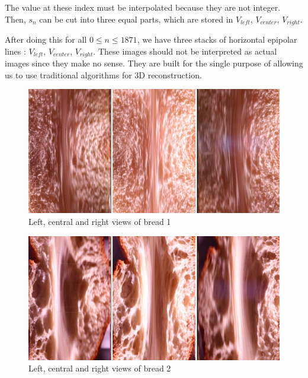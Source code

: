 \documentclass[a4paper,twocolumn,fleqn]{article}
\begin{document}
The value at these index must be interpolated because they are not integer. Then, $s_n$ can be cut into three equal parts, which are stored in $V_{left}$, $V_{center}$, $V_{right}$.

After doing this for all $0 \leq n \leq 1871$, we have three stacks of horizontal epipolar lines :  $V_{left}$, $V_{center}$, $V_{right}$. These images should not be interpreted as actual images since they make no sense. They are built for the single purpose of allowing us to use traditional algorithms for 3D reconstruction.

\begin{figure}[!hb]
  \centering
  \includegraphics[width=1\columnwidth]{img/bread01_merged.JPG}
  \caption{Left, central and right views of bread 1}
\end{figure}

\begin{figure}[!hb]
  \centering
  \includegraphics[width=1\columnwidth]{img/bread02_merged.JPG}
  \caption{Left, central and right views of bread 2}
\end{figure}
\end{document}
